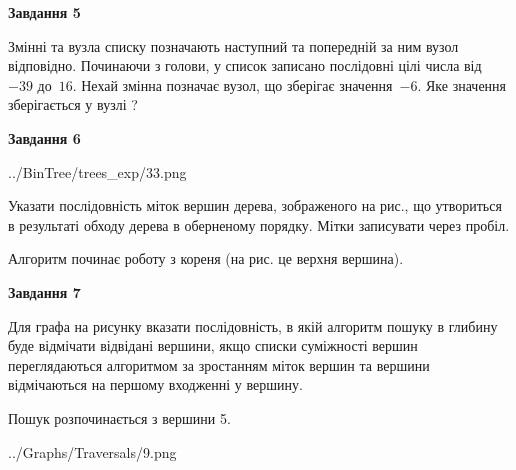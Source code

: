 \documentclass[12pt, ukrainian]{article}
\begin{document}
{\begin {large}
{\begin {center}\textbf{Завдання 5}\end {center}}\par
Змінні  та  вузла списку позначають наступний та попередній за ним вузол відповідно. Починаючи з голови, у список записано послідовні цілі числа від~$-39$ до~$16$. Нехай змінна  позначає вузол, що зберігає значення~$-6$.
Яке значення зберігається у вузлі  ?\par
\newpage

{\begin {center}\textbf{Завдання 6}\end {center}}\par

\begin{center}
	{../BinTree/trees_exp/33.png}
\end{center}
Указати послідовність міток вершин дерева, зображеного на рис., що утвориться в результаті обходу дерева в оберненому порядку. Мітки записувати через пробіл.\par Алгоритм починає роботу з кореня (на рис. це верхня вершина).\par
\newpage

{\begin {center}\textbf{Завдання 7}\end {center}}\par
Для графа на рисунку вказати послідовність, в якій алгоритм пошуку в глибину буде відмічати відвідані вершини, якщо списки суміжності вершин переглядаються алгоритмом за зростанням міток вершин та вершини відмічаються на першому вход\-женні у вершину.\par
Пошук розпочинається з вершини 5.\par

\begin{center}
	{../Graphs/Traversals/9.png}
\end{center}\par
\newpage


\end{large}}
\end{document}
